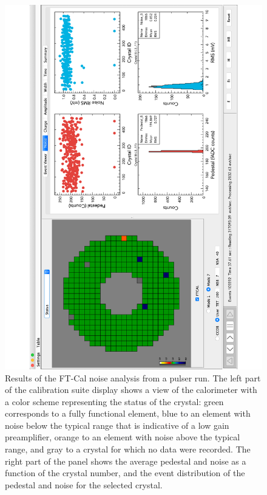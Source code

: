 \begin{figure}
\includegraphics[height=1.0\columnwidth,angle=270]{fig/ftcal_pulserrun.pdf}
\caption{Results of the FT-Cal noise analysis from a pulser run. The left part of the calibration suite display shows a
  view of the calorimeter with a color scheme representing the status of the crystal: green corresponds to a fully
  functional element, blue to an element with noise below the typical range that is indicative of a low gain preamplifier,
  orange to an element with noise above the typical range, and gray to a crystal for which no data were recorded. The
  right part of the panel shows the average pedestal and noise as a function of the crystal number, and the event
  distribution of the pedestal and noise for the selected crystal.}
\label{fig:ftcal_pulserrun}
\end{figure}

